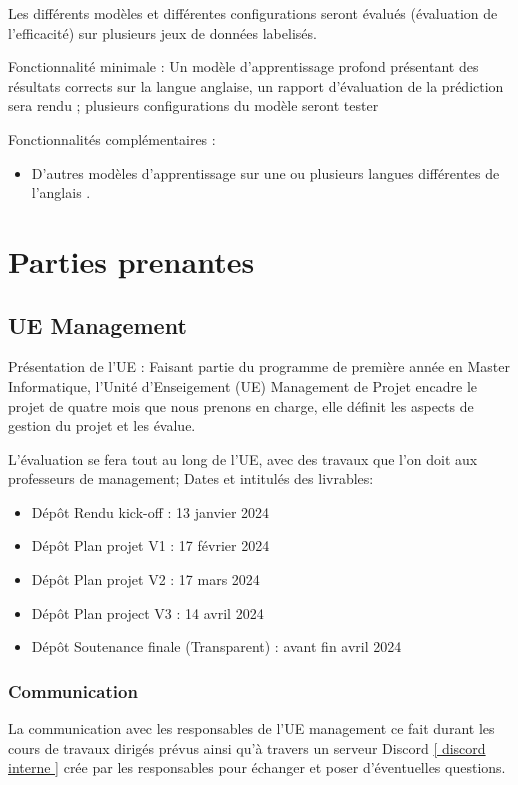 \documentclass[11pt]{rapport_class}
\begin{document}
Les différents modèles et différentes configurations seront évalués (évaluation de l'efficacité) sur plusieurs jeux de données labelisés.

Fonctionnalité minimale : Un modèle d'apprentissage profond présentant des résultats corrects sur la langue anglaise, un rapport d’évaluation de la prédiction sera rendu ; plusieurs configurations du modèle seront tester

Fonctionnalités complémentaires :
\begin{itemize}
\item D'autres modèles d'apprentissage sur une ou plusieurs langues différentes de l'anglais . 
\end{itemize}


\chapter{Parties prenantes}
\section{UE Management}
\qquad Présentation de l'UE : Faisant partie du programme de première année en Master Informatique, l'Unité d'Enseigement (UE) Management de Projet encadre le projet de quatre mois que nous prenons en charge, elle définit les aspects de gestion du projet et les évalue. 

L'évaluation se fera tout au long de l'UE, avec des travaux que l'on doit aux professeurs de management;
Dates et intitulés des livrables:
\begin{itemize}
    \item Dépôt Rendu kick-off  : 13 janvier 2024
    \item Dépôt Plan projet V1  : 17 février 2024
    \item Dépôt Plan projet V2  : 17 mars 2024
    \item Dépôt Plan project V3 : 14 avril 2024
    \item Dépôt Soutenance finale (Transparent) : avant fin avril 2024
\end{itemize}

\subsection{Communication} 
\qquad La communication avec les responsables de l'UE management ce fait durant les cours de travaux dirigés prévus ainsi qu'à travers un serveur Discord \ref{ discord interne } crée par les responsables pour échanger et poser d'éventuelles questions.
\end{document}

